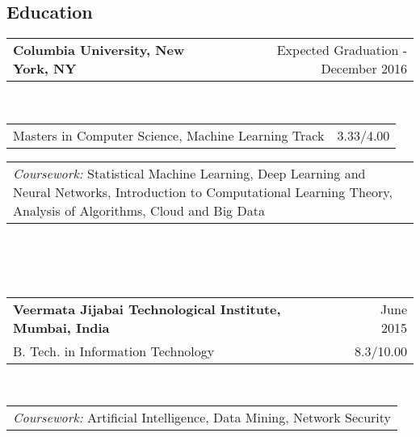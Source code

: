 \documentclass[margin,line]{res}
\begin{document}
\address {sm4083@columbia.edu $\mid$ 929-373-8678 $\mid$ 567 West 125th St. New York NY 10027}
\begin{resume}

\section{\sc\bf Education}
\begin{tabular}{p{3.41in}  r}
\bf Columbia University, New York, NY & Expected Graduation - December 2016
\end{tabular}
\\
\begin{tabular}{p{5.2in} r}
Masters in Computer Science, Machine Learning Track & 3.33/4.00\\
\end{tabular}
\begin{tabular}{p{5.92in}}
\textit{Coursework:} Statistical Machine Learning, Deep Learning and Neural Networks, Introduction to Computational Learning Theory, Analysis of Algorithms, Cloud and Big Data
\end{tabular}
\\\\\\
\begin{tabular}{p{5.136in} r}
\bf Veermata Jijabai Technological Institute, Mumbai, India & June 2015\\
B. Tech. in Information Technology & 8.3/10.00
\end{tabular}
\\
\begin{tabular}{p{5.92in}}
\textit{Coursework:} Artificial Intelligence, Data Mining, Network Security
\end{tabular}


\end{resume}
\end{document}
